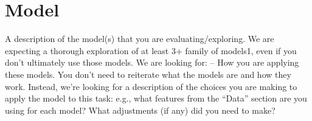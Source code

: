 \section{Model}
A description of the model(s) that you are evaluating/exploring. We are expecting a thorough
exploration of at least 3+ family of models1, even if you don’t ultimately use those models. We are looking for:
– How you are applying these models. You don’t need to reiterate what the models are and how they work. Instead, we’re looking for a description of the choices you are making to apply the model to this task: e.g., what features from the “Data” section are you using for each model? What adjustments (if any) did you need to make?
